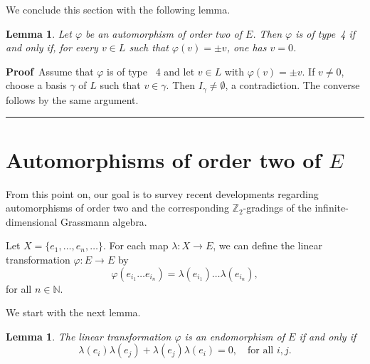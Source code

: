 \documentclass{article}
\newtheorem{lemma}[theorem]{Lemma}
\newenvironment{proof}[1][Proof]{\noindent\textbf{#1\,} }{\hfill \rule{0.5em}{0.5em}\medskip}
\begin{document}
	
	We conclude this section with the following lemma.
	
	\begin{lemma}\label{v=0}
		Let $\varphi$ be an automorphism of order two of $E$. Then $\varphi$ is of type~4 if and only if, for every $v \in L$ such that $\varphi(v) = \pm v$, one has $v = 0$.
	\end{lemma}
	\begin{proof}
		Assume that $\varphi$ is of type~ 4 and let $v \in L$ with $\varphi(v) = \pm v$. 
		If $v \neq 0$, choose a basis $\gamma$ of $L$ such that $v \in \gamma$. 
		Then $I_{\gamma} \neq \emptyset$, a contradiction. 
		The converse follows by the same argument.
	\end{proof}
	
	
	
	
	
	
	\section{Automorphisms of order two of $E$}\label{main}
	
	From this point on, our goal is to survey recent developments regarding automorphisms of order two and the corresponding $\mathbb{Z}_2$-gradings of the infinite-dimensional Grassmann algebra.
	
	Let $X=\{e_{1}, \ldots, e_{n},\ldots\}$. For each map $\lambda : X\to E$, we can define the linear transformation $\varphi: E\to E$ by
	\begin{equation}\label{estend to a linear trans}
		\varphi(e_{i_1}\ldots e_{i_n})=\lambda(e_{i_1})\ldots \lambda(e_{i_n}),
	\end{equation}
	for all $n\in\mathbb{N}$.
	
	We start with the next lemma.
	
	\begin{lemma}\label{linear trans for end}
		The linear transformation $\varphi$ is an endomorphism of $E$ if and only if 
		\[
		\lambda(e_{i})\lambda(e_{j}) + \lambda(e_{j})\lambda(e_{i}) = 0, \quad \text{for all } i, j.
		\]
	\end{lemma}
	
\end{document}
